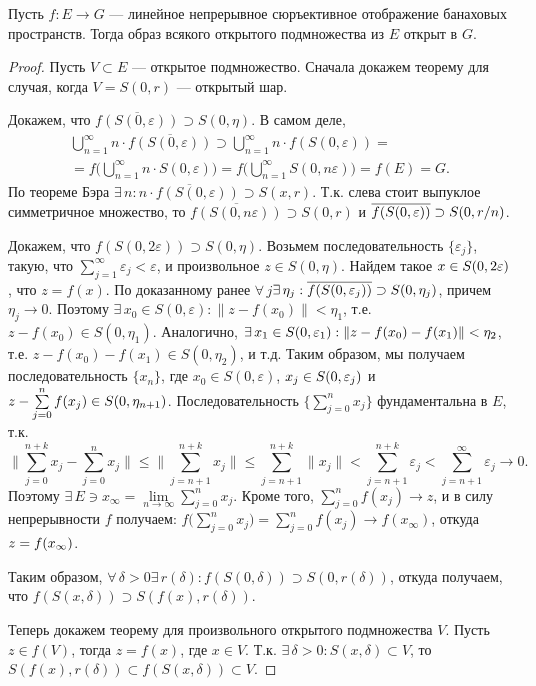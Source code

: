 \documentclass[12pt,titlepage, a4paper]{article}
\begin{document}
\begin{theorem}
Пусть $f\colon E\to G$ --- линейное непрерывное сюръективное
отображение банаховых пространств. Тогда образ всякого открытого
подмножества из $E$ открыт в $G$.
\end{theorem}

\begin{proof}
Пусть $V\subset E$ --- открытое подмножество. Сначала докажем
теорему для случая, когда $V=S(0,r)$ --- открытый шар.

Докажем, что $\overline{f(S(0,\varepsilon))}\supset S(0,\eta)$. В
самом деле,
\begin{multline*}
\bigcup\limits_{n=1}^\infty
n\cdot\overline{f(S(0,\varepsilon))}\supset\bigcup\limits_{n=1}^\infty
n\cdot f(S(0,\varepsilon))=\\= f\Big(\bigcup\limits_{n=1}^\infty
n\cdot S(0,\varepsilon)\Big)=f\Big(\bigcup\limits_{n=1}^\infty
S(0,n\varepsilon)\Big)=f(E)=G.
\end{multline*}
По теореме Бэра $\exists\,n:\overline{n\cdot
f(S(0,\varepsilon))}\supset S(x,r)$. Т.к. слева стоит выпуклое
симметричное множество, то $\overline{f(S(0,n\varepsilon))}\supset
S(0,r)$ и $\overline{f(S(0,\varepsilon))}\p\supset S(0,r/n)$.

Докажем, что $f(S(0,2\varepsilon))\supset S(0,\eta)$. Возьмем
последовательность $\{\varepsilon_j\}$, такую, что
$\sum\limits_{j=1}^\infty \varepsilon_j<\varepsilon$, и произвольное
$z\in S(0,\eta)$. Найдем такое $x\p\in S(0,2\varepsilon)$, что
$z=f(x)$. По доказанному ранее
$\forall\,j$\;\;$\exists\,\eta_j:\overline{f(S(0,\varepsilon_j))}\p\supset
S(0,\eta_j)$, причем $\eta_j\to 0$. Поэтому $\exists\,x_0\in
S(0,\varepsilon): \|z-f(x_0)\|<\eta_1$, т.е. $z-f(x_0)\in
S(0,\eta_1)$. Аналогично, $\exists\,x_1\in
S(0,\varepsilon_1):\|z-f(x_0)-f(x_1)\|\p<\eta_2$, т.е.
$z-f(x_0)-f(x_1)\in S(0,\eta_2)$, и т.д. Таким образом, мы получаем
последовательность $\{x_n\}$, где $x_0\in S(0,\varepsilon)$,
$x_j\p\in S(0,\varepsilon_j)$ и $z-\sum\limits_{j=0}^nf(x_j)\p\in
S(0,\eta_{n+1})$. Последовательность $\Big\{\sum\limits_{j=0}^n
x_j\Big\}$ фундаментальна в $E$, т.к.
$$\Big\|\sum\limits_{j=0}^{n+k}x_j-\sum\limits_{j=0}^n x_j\Big\|\leqslant
\Big\|\sum\limits_{j=n+1}^{n+k}x_j\Big\|\leqslant\sum\limits_{j=n+1}^{n+k}\|x_j\|
<\sum\limits_{j=n+1}^{n+k}\varepsilon_j<\sum\limits_{j=n+1}^\infty
\varepsilon_j\to 0.$$ Поэтому $\exists\,E\ni
x_\infty=\lim\limits_{n\to\infty}\sum\limits_{j=0}^n x_j$. Кроме
того, $\sum\limits_{j=0}^nf(x_j)\to z$, и в силу непрерывности $f$
получаем: $f\Big(\sum\limits_{j=0}^n
x_j\Big)=\sum\limits_{j=0}^nf(x_j)\to f(x_\infty)$, откуда
$z\p=f(x_\infty)$.

Таким образом,
$\forall\,\delta>0$\;\;$\exists\,r(\delta):f(S(0,\delta))\supset
S(0,r(\delta))$, откуда получаем, что $f(S(x,\delta))\supset
S(f(x),r(\delta))$.

Теперь докажем теорему для произвольного открытого подмножества $V$.
Пусть $z\in f(V)$, тогда $z=f(x)$, где $x\in V$. Т.к.
$\exists\,\delta>0:S(x,\delta)\subset V$, то
$S(f(x),r(\delta))\subset f(S(x,\delta))\subset V$.
\end{proof}
\end{document}
